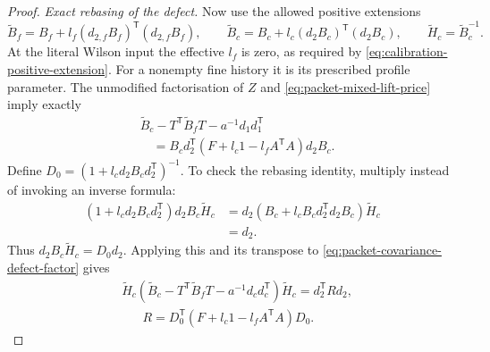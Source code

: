 \documentclass[11pt,reqno]{amsart}
\numberwithin{equation}{section}
\theoremstyle{definition}
\theoremstyle{remark}
\begin{document}
\begin{proof}
\smallskip\noindent
\emph{Exact rebasing of the defect.}
Now use the allowed positive extensions
\[
 \widetilde B_f
    =B_f+l_f(d_{2,f}B_f)^{\mathsf T}(d_{2,f}B_f),\qquad
 \widetilde B_c
    =B_c+l_c(d_2B_c)^{\mathsf T}(d_2B_c),
 \qquad \widetilde H_c=\widetilde B_c^{-1}.
\]
At the literal Wilson input the effective \(l_f\) is zero,
as required by \eqref{eq:calibration-positive-extension}.
For a nonempty fine history it is its prescribed profile
parameter. The unmodified factorisation of \(Z\) and
\eqref{eq:packet-mixed-lift-price} imply exactly
\begin{equation}
 \begin{split}
 &\widetilde B_c-T^{\mathsf T}\widetilde B_fT-a^{-1}d_1d_1^{\mathsf T}\\
 &\hspace{12pt}
       =B_cd_2^{\mathsf T}(F+l_c1-l_fA^{\mathsf T}A)d_2B_c.
 \end{split}
 \label{eq:packet-covariance-defect-factor}
\end{equation}
Define \(D_0=(1+l_cd_2B_cd_2^{\mathsf T})^{-1}\).
To check the rebasing identity, multiply instead of invoking
an inverse formula:
\[
 \begin{split}
 (1+l_cd_2B_cd_2^{\mathsf T})d_2B_c\widetilde H_c
 &=d_2(B_c+l_cB_cd_2^{\mathsf T}d_2B_c)\widetilde H_c\\
 &=d_2.
 \end{split}
\]
Thus \(d_2B_c\widetilde H_c=D_0d_2\). Applying this and
its transpose to \eqref{eq:packet-covariance-defect-factor}
gives
\begin{equation}
 \begin{aligned}
 &\widetilde H_c(\widetilde B_c-T^{\mathsf T}\widetilde B_fT
                    -a^{-1}d_cd_c^{\mathsf T})\widetilde H_c=d_2^{\mathsf T}Rd_2,\\
 &\hspace{20pt}R=D_0^{\mathsf T}(F+l_c1-l_fA^{\mathsf T}A)D_0.
 \end{aligned}
 \label{eq:packet-positive-defect}
\end{equation}


\end{proof}
\end{document}
